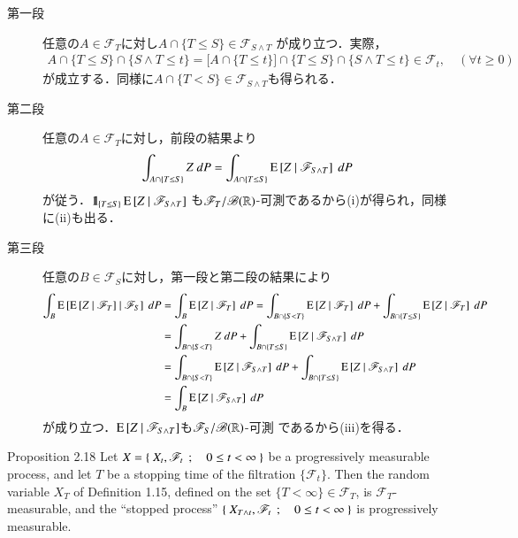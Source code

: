 	\begin{prf}\mbox{}
		\begin{description}
			\item[第一段]
				任意の$A \in \mathscr{F}_T$に対し$A \cap \{T \leq S\} \in \mathscr{F}_{S \wedge T}$
				が成り立つ．実際，
				\begin{align}
					A \cap \{T \leq S\} \cap \{S \wedge T \leq t\}
					= \biggl[ A \cap \{T \leq t\} \biggr] \cap \{T \leq S\} \cap \{S \wedge T \leq t\}
					\in \mathscr{F}_t,
					\quad (\forall t \geq 0)
				\end{align}
				が成立する．同様に$A \cap \{T < S\} \in \mathscr{F}_{S \wedge T}$も得られる．
				
			\item[第二段]
				任意の$A \in \mathscr{F}_T$に対し，前段の結果より
				\begin{align}
					\int_{A \cap \{T \leq S\}} Z\ dP
					= \int_{A \cap \{T \leq S\}} \operatorname{E} \left[ Z \ \middle|\ \mathscr{F}_{S \wedge T} \right]\ dP
				\end{align}
				が従う．$\mbox{1}\hspace{-0.25em}\mbox{l}_{\{T \leq S\}} \operatorname{E} \left[ Z \ \middle|\ \mathscr{F}_{S \wedge T} \right]$
				も$\mathscr{F}_T/\mathscr{B}(\mathbb{R})$-可測であるから(i)が得られ，同様に(ii)も出る．
			
			\item[第三段]
				任意の$B \in \mathscr{F}_S$に対し，第一段と第二段の結果により
				\begin{align}
					\int_B \cexp{\cexp{Z}{\mathscr{F}_T}}{\mathscr{F}_S}\ dP
					&= \int_B \cexp{Z}{\mathscr{F}_T}\ dP
					= \int_{B\cap\{S < T\}} \cexp{Z}{\mathscr{F}_T}\ dP
						+ \int_{B\cap\{T \leq S\}} \cexp{Z}{\mathscr{F}_T}\ dP \\
					&= \int_{B \cap \{S < T\}} Z\ dP
						+ \int_{B\cap\{T \leq S\}} \cexp{Z}{\mathscr{F}_{S \wedge T}}\ dP \\
					&= \int_{B \cap \{S < T\}} \cexp{Z}{\mathscr{F}_{S \wedge T}}\ dP
						+ \int_{B\cap\{T \leq S\}} \cexp{Z}{\mathscr{F}_{S \wedge T}}\ dP \\
					&= \int_B \cexp{Z}{\mathscr{F}_{S \wedge T}}\ dP
				\end{align}
				が成り立つ．$\operatorname{E} \left[ Z \ \middle|\ \mathscr{F}_{S \wedge T} \right]$も$\mathscr{F}_S/\mathscr{B}(\mathbb{R})$-可測
				であるから(iii)を得る．
				\QED
		\end{description}
	\end{prf}
	
	\begin{itembox}[l]{Proposition 2.18}\label{chapter_1_Problem_2_18}
		Let $X = \left\{\ X_t,\mathscr{F}_t\ \, ; \quad 0 \leq t < \infty\ \right\}$ be a progressively measurable 
		process, and let $T$ be a stopping time of the filtration $\{\mathscr{F}_t\}$. 
		Then the random variable $X_T$ of Definition 1.15, defined on the set 
		$\{T < \infty\} \in \mathscr{F}_T$, is $\mathscr{F}_T$-measurable, and
		the ``stopped process'' $\left\{\ X_{T \wedge t},\mathscr{F}_t\ \, ; \quad 0 \leq t < \infty\ \right\}$
		is progressively measurable.
	\end{itembox}
	
